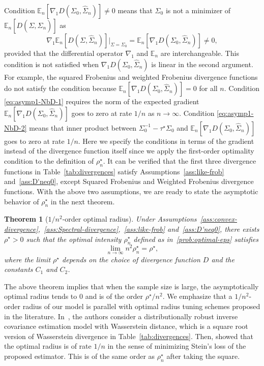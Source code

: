 \documentclass[11pt]{article}
\newtheorem{theorem}{Theorem}
\newcommand{\opt}{^\star}
\def\E {\mathbb{E}}
\newcommand{\wh}{\widehat}
\begin{document}
Condition $\E_n[{\nabla_1 D }(\Sigma_0, \wh\Sigma_n)]\neq 0$
means that $\Sigma_0$ is not a minimizer of $\E_n[{D }(\Sigma, \wh\Sigma_n)]$ as 
\[
{\nabla_1  }\E_n[D(\Sigma, \wh\Sigma_n)]|_{\Sigma=\Sigma_0}
=\E_n[{\nabla_1 D }(\Sigma_0, \wh\Sigma_n)]\neq 0,
\]
provided that the differential operator $\nabla_1$ and $\E_n$ are interchangeable. This condition is not satisfied when
$\nabla_1 D (\Sigma_0, \wh\Sigma_n)$ is linear in the second argument. For example, the squared Frobenius and weighted Frobenius divergence functions do not satisfy the condition because $\E_n[{\nabla_1 D }(\Sigma_0,\wh\Sigma_n)]=0$ for all $n$. 
Condition \eqref{eq:asymp1-NbD-1} requires the norm of the expected gradient $\E_n[{\nabla_1 D }(\Sigma_0, \wh\Sigma_n)]$ goes to zero at rate $1/n$ as $n\to\infty$. Condition \eqref{eq:asymp1-NbD-2} means that inner product between $ \Sigma_0^{-1}-\tau\opt\Sigma_0$ and $ \E_n [{\nabla_1 D }(\Sigma_0, \wh\Sigma_n)]$ goes to zero at rate $1/n$. Here we specify the conditions in terms of the gradient instead of the divergence function itself since we apply the first-order optimality condition to the definition of $\rho\opt_n$. 
It can be verified that the first three divergence functions in  Table~\ref{tab:divergences} satisfy Assumptions~\ref{ass:like-frob} and~\ref{ass:D'neq0}, except 
Squared Frobenius and Weighted Frobenius divergence functions.
With the above two assumptions, we are ready to state 
the asymptotic behavior of $ \rho_n\opt$  in the next theorem.


\begin{theorem}[$1/n^2$-order optimal radius]\label{thm:optimal-eps-limit}
    Under Assumptions~\ref{ass:convex-divergence},~\ref{ass:Spectral-divergence},~\ref{ass:like-frob} and~\ref{ass:D'neq0}, there exists $ \rho\opt>0$ such that the optimal intensity $ \rho_n\opt$ defined as in~\eqref{prob:optimal-eps} satisfies
    \begin{equation}
        \lim_{n\to\infty} n^2  \rho_n\opt =  \rho\opt,   
    \end{equation}
    where the limit $ \rho\opt$ depends on the choice of divergence function $D$ and the constants $C_1$ and $C_2$.
\end{theorem}

The above theorem implies that when the sample size is large, the asymptotically optimal radius tends to $0$ and is of the order $ \rho\opt/n^2$.
We emphasize that a $1/n^2$-order radius of our model is parallel with optimal radius tuning schemes proposed in the literature. In~\cite{ref:nguyen2022distributionally}, the authors consider a distributionally robust inverse covariance estimation model with Wasserstein distance, which is a square root version of Wasserstein divergence in Table~\ref{tab:divergences}. Then, \citet[Theorem~1]{ref:BLANCHET2019618} showed that the optimal radius is of rate $1/n$ in the sense of minimizing Stein's loss of the proposed estimator. This is of the same order as $ \rho_n\opt$ after taking the square. 
\end{document}
